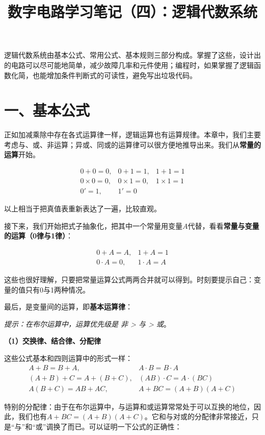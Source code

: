 \documentclass[UTF8]{ctexart}
\title{数字电路学习笔记（四）：逻辑代数系统}
\begin{document}
\maketitle
逻辑代数系统由基本公式、常用公式、基本规则三部分构成。掌握了这些，设计出的电路可以尽可能地简单，减少故障几率和元件使用；编程时，如果掌握了逻辑函数化简，也能增加条件判断式的可读性，避免写出垃圾代码。

\section*{一、基本公式}

正如加减乘除中存在各式运算律一样，逻辑运算也有运算规律。本章中，我们主要考虑与、或、非运算；异或、同或的运算律可以很方便地推导出来。我们从\textbf{常量的运算}开始。

\[\begin{matrix}
    0+0=0,&0+1=1,&1+1=1\\
    0\times 0=0,&0\times 1=0,&1\times 1=1\\
    0'=1,&1'=0
\end{matrix}\]

以上相当于把真值表重新表达了一遍，比较直观。

接下来，我们开始把式子抽象化，把其中一个常量用变量$A$代替，看看\textbf{常量与变量的运算（0律与1律）}：

\[\begin{matrix}
    0+A=A,&1+A=1\\
    0\cdot A=0,&1\cdot A=A
\end{matrix}\]

这些也很好理解，只要把常量运算公式两两合并就可以得到。时刻要提示自己：变量的值只有0与1两种情况。

最后，是变量间的运算，即\textbf{基本运算律}：

\textit{提示：在布尔运算中，运算优先级是 非 > 与 > 或}。

\textbf{（1）交换律、结合律、分配律}

这些公式基本和四则运算中的形式一样：
\[\begin{matrix}
    A+B=B+A,&A\cdot B=B\cdot A\\
    (A+B)+C=A+(B+C),&(AB)\cdot C=A\cdot (BC)\\
    A(B+C)=AB+AC,&A+BC=(A+B)(A+C)
\end{matrix}\]

特别的分配律：由于在布尔运算中，与运算和或运算常常处于可以互换的地位，因此，我们也有$A+BC=(A+B)(A+C)$。它和与对或的分配律非常接近，只是“与”和“或”调换了而已。可以证明一下公式的正确性：
\end{document}

